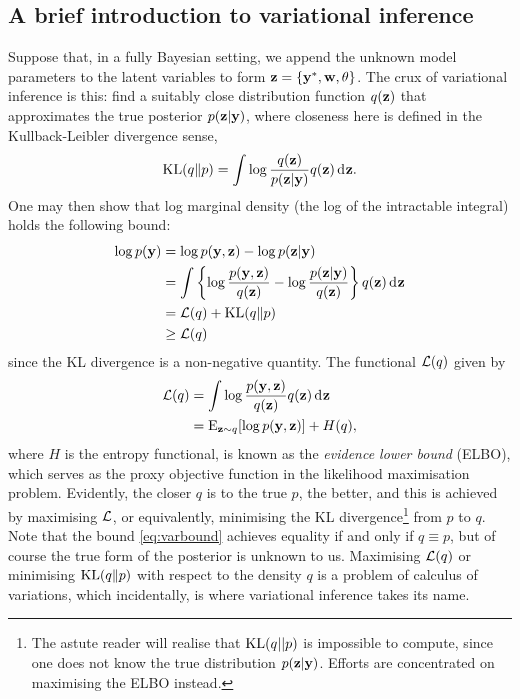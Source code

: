 \subsection{A brief introduction to variational inference}

Suppose that, in a fully Bayesian setting, we append the unknown model parameters to the latent variables to form ${\mathbf z} = \{{\mathbf y}^*, {\mathbf w}, \theta\}$.
The crux of variational inference is this: find a suitably close distribution function $q({\mathbf z})$ that approximates the true posterior $p({\mathbf z}|{\mathbf y})$, where closeness here is defined in the Kullback-Leibler divergence sense,
\[
  \operatorname{KL}(q\Vert p) = \int \log \frac{q({\mathbf z})}{p({\mathbf z}|{\mathbf y})} q({\mathbf z}) \operatorname{d}\hspace{0.5pt}\! {\mathbf z}.
\]
One may then show that log marginal density (the log of the intractable integral) holds the following bound:
    \begin{align}
      \log p({\mathbf y}) &= \log p({\mathbf y},{\mathbf z}) - \log p({\mathbf z}|{\mathbf y}) \nonumber \\
      &= \int \left\{ \log \frac{p({\mathbf y},{\mathbf z})}{q({\mathbf z})} - \log \frac{p({\mathbf z}|{\mathbf y})}{q({\mathbf z})} \right\} q({\mathbf z}) \operatorname{d}\hspace{0.5pt}\! {\mathbf z} \nonumber \\    
      &=  {\mathcal L}(q) +  \operatorname{KL}(q \Vert p) \nonumber \\
      &\geq {\mathcal L}(q) \label{eq:varbound}
    \end{align}
since the KL divergence is a non-negative quantity.
The functional ${\mathcal L}(q)$ given by 
\begin{align}
  {\mathcal L}(q) 
  &= \int \log \frac{p({\mathbf y},{\mathbf z})}{q({\mathbf z})} q({\mathbf z}) \operatorname{d}\hspace{0.5pt}\! {\mathbf z} \nonumber \\
  &= \operatorname{E}_{{\mathbf z}\sim q}[\log p({\mathbf y},{\mathbf z})] + H(q), \label{eq:elbo1}
\end{align}
where $H$ is the entropy functional, is known as the \emph{evidence lower bound} (ELBO), which serves as the proxy objective function in the likelihood maximisation problem.
Evidently, the closer $q$ is to the true $p$, the better, and this is achieved by maximising ${\mathcal L}$, or equivalently, minimising the KL divergence\footnote{The astute reader will realise that $\operatorname{KL}(q||p)$ is impossible to compute, since one does not know the true distribution $p({\mathbf z}|{\mathbf y})$. Efforts are concentrated on maximising the ELBO instead.} from $p$ to $q$.
Note that the bound \cref{eq:varbound} achieves equality if and only if $q \equiv p$, but of course the true form of the posterior is unknown to us.
Maximising ${\mathcal L}(q)$ or minimising $\operatorname{KL}(q\Vert p)$ with respect to the density $q$ is a problem of calculus of variations, which incidentally, is where variational inference takes its name.

